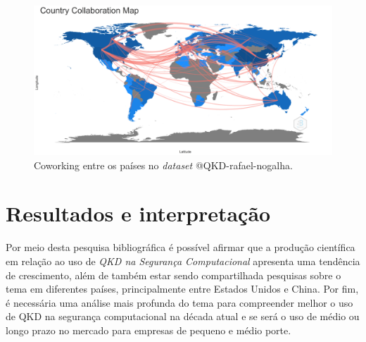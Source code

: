 \begin{figure}[H]
    \centering
    \includegraphics[width=1\textwidth]{experiments/rafaelnogalha/PesquisaBibliografica/QKDSegurancaComputacional/images/country_collaboration_map.png}
    \caption{Coworking entre os países no \textit{dataset} @QKD-rafael-nogalha.}
    \label{fig:cowrking:prod:@QKD-rafael-nogalha}
\end{figure}



\section{Resultados e interpretação}

Por meio desta pesquisa bibliográfica é possível afirmar que a produção científica em relação ao uso de \textit{QKD na Segurança Computacional} apresenta uma tendência de crescimento, além de também estar sendo compartilhada pesquisas sobre o tema em diferentes países, principalmente entre Estados Unidos e China. Por fim, é necessária uma análise mais profunda do tema para compreender melhor o uso de QKD na segurança computacional na década atual e se será o uso de médio ou longo prazo no mercado para empresas de pequeno e médio porte.